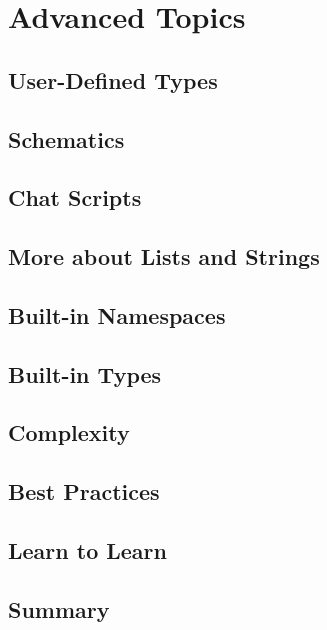\documentclass[oneside]{book}
\begin{document}
\chapter{Advanced Topics}
\blindtext

\section{User-Defined Types}
\blindtext

\section{Schematics}
\blindtext

\section{Chat Scripts}
\blindtext

\section{More about Lists and Strings}
\blindtext

\section{Built-in Namespaces}
\blindtext

\section{Built-in Types}
\blindtext

\section{Complexity}
\blindtext

\section{Best Practices}
\blindtext

\section{Learn to Learn}
\blindtext

\section{Summary}
\blindtext
\end{document}
